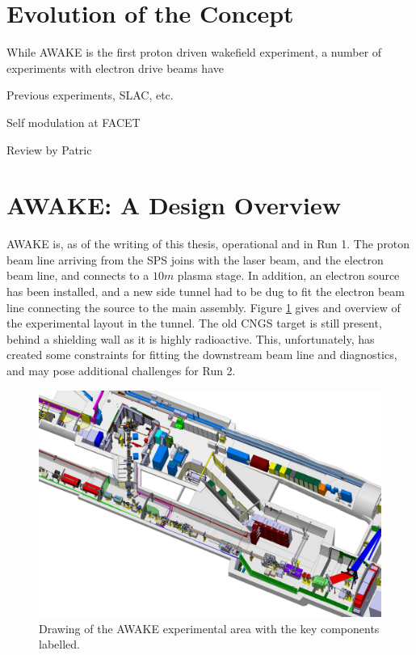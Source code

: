 \section{Evolution of the Concept}
\label{WFA:History}

While AWAKE is the first proton driven wakefield experiment, a number of experiments with electron drive beams have 




Previous experiments, SLAC, etc.

\cite{rosenzweig:1988, blumenfeld:2007, kallos:2008, litos:2014}

Self modulation at FACET \cite{adli:2016}

Review by Patric \cite{muggli:2009}

\section{AWAKE: A Design Overview}
\label{WFA:Design}

AWAKE is, as of the writing of this thesis, operational and in Run 1. The proton beam line arriving from the SPS joins with the laser beam, and the electron beam line, and connects to a $10\unit{m}$ plasma stage. In addition, an electron source has been installed, and a new side tunnel had to be dug to fit the electron beam line connecting the source to the main assembly. Figure \ref{Fig:WFA:AWAKE} gives and overview of the experimental layout in the tunnel. The old CNGS target is still present, behind a shielding wall as it is highly radioactive. This, unfortunately, has created some constraints for fitting the downstream beam line and diagnostics, and may pose additional challenges for Run 2.

\begin{figure}[hbt]
    \centering
    \includegraphics[width=0.99\linewidth,trim={0mm 0mm 0mm 0mm},clip]{figures/AwakeExperiment}
    \caption{\label{Fig:WFA:AWAKE} Drawing of the AWAKE experimental area with the key components labelled.}
\end{figure}

